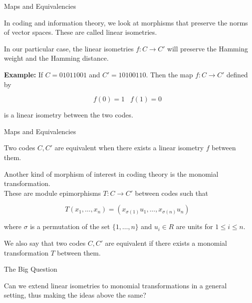 \documentclass{beamer}
\begin{document}
\begin{frame}{Maps and Equivalencies}
    
    In coding and information theory, we look at morphisms that preserve the norms of vector spaces.
    These are called linear isometries.

    \bigskip

    In our particular case, the linear isometries $f:C\to C'$ will preserve the Hamming weight
    and the Hamming distance.

    \bigskip

    \pause

    \textbf{Example:} If $C=01011001$ and $C'=10100110$. Then the map $f:C\to C'$ defined by

    $$f(0)=1\;\;\;f(1)=0$$
    
    is a linear isometry between the two codes.

\end{frame}

\begin{frame}{Maps and Equivalencies}

    Two codes $C,C'$ are equivalent when there exists a linear isometry $f$ between them.

    \bigskip

    \pause
    
    Another kind of morphism of interest in coding theory is the monomial transformation.\\
    These are module epimorphisms $T:C\to C'$ between codes such that

    $$T(x_1,\ldots,x_n)=(x_{\sigma(1)}u_1,\ldots,x_{\sigma(n)}u_n)$$
    
    where $\sigma$ is a permutation of the set $\{1,\ldots,n\}$ and $u_i\in R$ are units for
    $1\leq i\leq n$.

    \bigskip

    \pause
    
    We also say that two codes $C,C'$ are equivalent if there exists a monomial transformation $T$
    between them.

\end{frame}

\begin{frame}{The Big Question}
    
    Can we extend linear isometries to monomial transformations in a general setting, thus making the
    ideas above the same?

\end{frame}
\end{document}
